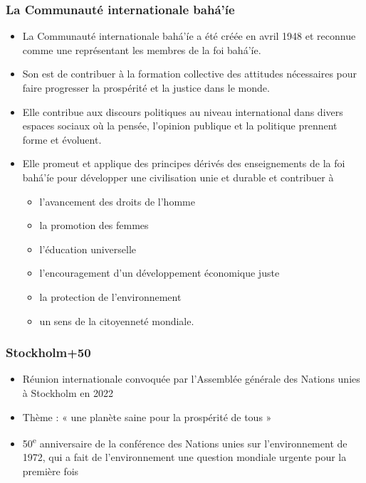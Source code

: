 \documentclass[11pt,xcolor={dvipsnames},hyperref={pdftex,pdfpagemode=UseNone,hidelinks,pdfdisplaydoctitle=true},usepdftitle=false]{beamer}
\begin{document}
\begin{frame}[allowframebreaks=0.8]
  \frametitle{La Communauté internationale bahá'íe}
  \begin{itemize}
    \item La Communauté internationale bahá'íe a été créée en avril 1948 et
      reconnue comme une  représentant les membres de la
      foi bahá'íe.
    \item Son  est de contribuer à la formation collective des
      attitudes nécessaires pour faire progresser la prospérité et la justice
      dans le monde.
    \item Elle contribue aux discours politiques au niveau international dans
      divers espaces sociaux où la pensée, l'opinion publique et la politique
      prennent forme et évoluent.
    \item Elle promeut et applique des principes dérivés des enseignements de la
      foi bahá'íe pour développer une civilisation unie et durable et contribuer
      à
    \begin{itemize}
      \item l'avancement des droits de l'homme
      \item la promotion des femmes
      \item l'éducation universelle
      \item l'encouragement d'un développement économique juste
      \item la protection de l'environnement
      \item un sens de la citoyenneté mondiale.
    \end{itemize}
  \end{itemize}
\end{frame}

\begin{frame}
  \frametitle{Stockholm+50}
  \begin{itemize}
    \item Réunion internationale convoquée par l'Assemblée générale des
      Nations unies à Stockholm en 2022
    \item Thème : « une planète saine pour la prospérité de tous »
    \item 50\textsuperscript{e} anniversaire de la conférence des Nations unies
      sur l'environnement de 1972, qui a fait de l'environnement une question
      mondiale urgente pour la première fois
  \end{itemize}
\end{frame}
\end{document}
